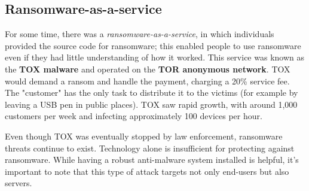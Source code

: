 \subsection*{Ransomware-as-a-service}
For some time, there was a \emph{ransomware-as-a-service}, in which individuals provided the source code for ransomware; this enabled people to use ransomware even if they had little understanding of how it worked. This service was known as the \textbf{TOX malware} and operated on the \textbf{TOR anonymous network}. TOX would demand a ransom and handle the payment, charging a 20\% service fee.
The "customer" has the only task to distribute it to the victims (for example by leaving a USB pen in public places).
TOX saw rapid growth, with around 1,000 customers per week and infecting approximately 100 devices per hour.

Even though TOX was eventually stopped by law enforcement, ransomware threats continue to exist. Technology alone is insufficient for protecting against ransomware. While having a robust anti-malware system installed is helpful, it's important to note that this type of attack targets not only end-users but also servers.

